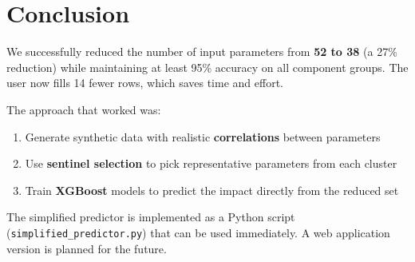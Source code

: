 \documentclass[12pt,a4paper]{article}
\begin{document}
\section{Conclusion}

We successfully reduced the number of input parameters from \textbf{52 to 38} (a 27\% reduction) while maintaining at least 95\% accuracy on all component groups. The user now fills 14 fewer rows, which saves time and effort.

The approach that worked was:
\begin{enumerate}
    \item Generate synthetic data with realistic \textbf{correlations} between parameters
    \item Use \textbf{sentinel selection} to pick representative parameters from each cluster
    \item Train \textbf{XGBoost} models to predict the impact directly from the reduced set
\end{enumerate}

The simplified predictor is implemented as a Python script (\texttt{simplified\_predictor.py}) that can be used immediately. A web application version is planned for the future.
\end{document}
